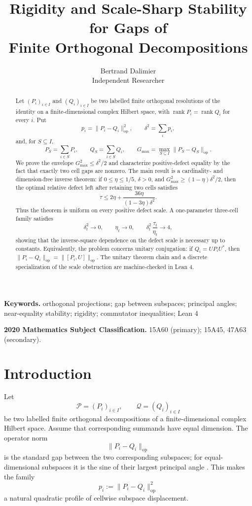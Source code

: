 \documentclass[11pt]{article}
\title{Rigidity and Scale-Sharp Stability for Gaps of\\
Finite Orthogonal Decompositions}
\author{Bertrand Dalimier\\
Independent Researcher}
\date{}
\newcommand{\op}{\mathrm{op}}
\newcommand{\gmax}{G_{\max}}
\newcommand{\dd}{\delta}
\begin{document}
\maketitle

\begin{abstract}
Let $(P_i)_{i\in I}$ and $(Q_i)_{i\in I}$ be two labelled finite orthogonal
resolutions of the identity on a finite-dimensional complex Hilbert space,
with $\operatorname{rank}P_i=\operatorname{rank}Q_i$ for every $i$.  Put
\[
  p_i=\|P_i-Q_i\|_{\op}^2,\qquad
  \dd^2=\sum_i p_i,
\]
and, for $S\subseteq I$,
\[
  P_S=\sum_{i\in S}P_i,\qquad
  Q_S=\sum_{i\in S}Q_i,\qquad
  \gmax=\max_{S\subseteq I}\|P_S-Q_S\|_{\op}.
\]
We prove the envelope $\gmax^2\le\dd^2/2$ and characterize positive-defect
equality by the fact that exactly two cell gaps are nonzero.  The main result
is a cardinality- and dimension-free inverse theorem: if
$0\le\eta\le1/5$, $\dd>0$, and
$\gmax^2\ge(1-\eta)\dd^2/2$, then the optimal relative defect left after
retaining two cells satisfies
\[
  \tau\le
  2\eta+\frac{36\eta}{(1-3\eta)\dd^2}.
\]
Thus the theorem is uniform on every positive defect scale.  A one-parameter
three-cell family satisfies
\[
  \dd_t^2\to0,\qquad \eta_t\to0,\qquad
  \dd_t^2\,\frac{\tau_t}{\eta_t}\to4,
\]
showing that the inverse-square dependence on the defect scale is necessary
up to constants.  Equivalently, the problem concerns unitary conjugation:
if $Q_i=UP_iU^*$, then
$\|P_i-Q_i\|_{\op}=\|[P_i,U]\|_{\op}$.  The unitary theorem chain and a
discrete specialization of the scale obstruction are machine-checked in
Lean 4.
\end{abstract}

\noindent\textbf{Keywords.}
orthogonal projections; gap between subspaces; principal angles;
near-equality stability; rigidity; commutator inequalities; Lean 4

\noindent\textbf{2020 Mathematics Subject Classification.}
15A60 (primary); 15A45, 47A63 (secondary).

\section{Introduction}

Let
\[
  \mathcal P=(P_i)_{i\in I},
  \qquad
  \mathcal Q=(Q_i)_{i\in I}
\]
be two labelled finite orthogonal decompositions of a finite-dimensional
complex Hilbert space.  Assume that corresponding summands have equal
dimension.  The operator norm
\[
  \|P_i-Q_i\|_{\op}
\]
is the standard gap between the two corresponding subspaces; for
equal-dimensional subspaces it is the sine of their largest principal angle
\cite{BjorckGolub1973,MiaoBenIsrael1992,GalantaiHegedus2006,Galantai2008}.
This makes the family
\[
  p_i:=\|P_i-Q_i\|_{\op}^2
\]
a natural quadratic profile of cellwise subspace displacement.
\end{document}
